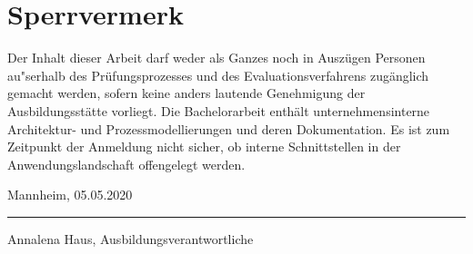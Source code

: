 \chapter*{Sperrvermerk}
Der Inhalt dieser Arbeit darf weder als Ganzes noch in Auszügen Personen au"serhalb des Prüfungsprozesses und des Evaluationsverfahrens zugänglich gemacht werden, sofern keine anders lautende Genehmigung der Ausbildungsstätte vorliegt. Die Bachelorarbeit enthält unternehmensinterne Architektur- und Prozessmodellierungen und deren Dokumentation. Es ist zum Zeitpunkt der Anmeldung nicht sicher, ob interne Schnittstellen in der Anwendungslandschaft offengelegt werden.


\vspace{3cm}
\noindent Mannheim, 05.05.2020\hfill\rule{8.4cm}{.4pt}\par
\noindent\hfill Annalena Haus, Ausbildungsverantwortliche
\cleardoublepage

